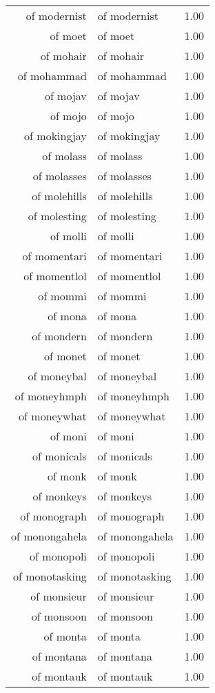 \begin{table}[ht]
\begin{tabular}{rlr}
  of modernist & of modernist & 1.00 \\ 
  of moet & of moet & 1.00 \\ 
  of mohair & of mohair & 1.00 \\ 
  of mohammad & of mohammad & 1.00 \\ 
  of mojav & of mojav & 1.00 \\ 
  of mojo & of mojo & 1.00 \\ 
  of mokingjay & of mokingjay & 1.00 \\ 
  of molass & of molass & 1.00 \\ 
  of molasses & of molasses & 1.00 \\ 
  of molehills & of molehills & 1.00 \\ 
  of molesting & of molesting & 1.00 \\ 
  of molli & of molli & 1.00 \\ 
  of momentari & of momentari & 1.00 \\ 
  of momentlol & of momentlol & 1.00 \\ 
  of mommi & of mommi & 1.00 \\ 
  of mona & of mona & 1.00 \\ 
  of mondern & of mondern & 1.00 \\ 
  of monet & of monet & 1.00 \\ 
  of moneybal & of moneybal & 1.00 \\ 
  of moneyhmph & of moneyhmph & 1.00 \\ 
  of moneywhat & of moneywhat & 1.00 \\ 
  of moni & of moni & 1.00 \\ 
  of monicals & of monicals & 1.00 \\ 
  of monk & of monk & 1.00 \\ 
  of monkeys & of monkeys & 1.00 \\ 
  of monograph & of monograph & 1.00 \\ 
  of monongahela & of monongahela & 1.00 \\ 
  of monopoli & of monopoli & 1.00 \\ 
  of monotasking & of monotasking & 1.00 \\ 
  of monsieur & of monsieur & 1.00 \\ 
  of monsoon & of monsoon & 1.00 \\ 
  of monta & of monta & 1.00 \\ 
  of montana & of montana & 1.00 \\ 
  of montauk & of montauk & 1.00 \\ 

\end{tabular}
\end{table}
